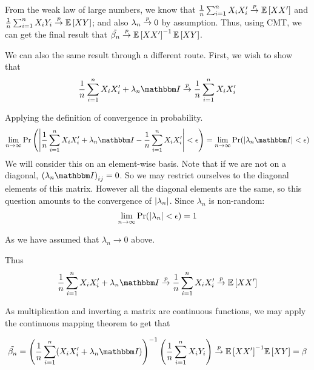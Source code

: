 \documentclass[12pt]{paper}
\begin{document}
From the weak law of large numbers, we know that $\frac{1}{n}
\sum_{i=1}^n X_i X_i' \overset{p}{\to} \mathbb{E} \left [ X X' \right ]$ and $\frac{1}{n} \sum_{i=1}^n X_i
Y_i \overset{p}{\to} \mathbb{E} \left [ XY \right ]$; and also $\lambda_n\overset{p}{\to}0$ by assumption. Thus, using CMT, we can get the final result that $ \tilde{\beta_n}\overset{p}{\to} \mathbb{E} \left [ X X' \right ]^{-1}\mathbb{E} \left [ XY \right ]$. 

We can also the same result through a different route. First, we wish to show that
\begin{equation*}
  \frac{1}{n} \sum_{i=1}^n X_i X_i' + \lambda_n \eye \plim \frac{1}{n} \sum_{i=1}^n X_i X_i'
\end{equation*}

Applying the definition of convergence in probability.
\begin{align*}
  \lim_{n\rightarrow\infty} \Pr\left( \abs{ \frac{1}{n} \sum_{i=1}^n X_i X_i' + \lambda_n \eye -
  \frac{1}{n} \sum_{i=1}^n X_i X_i' } < \epsilon\right) &= \lim_{n\rightarrow\infty} \Pr( \abs{ \lambda_n
                                          \eye } < \epsilon)\\
\end{align*}
We will consider this on an element-wise basis. Note that if we are
not on a diagonal, $\left( \lambda_n \eye \right)_{ij} = 0$. So we may
restrict ourselves to the diagonal elements of this matrix. However
all the diagonal elements are the same, so this question amounts to
the convergence of $\left \lvert \lambda_n \right \rvert$. Since $\lambda_n$ is non-random: 
\begin{align*}
  \lim_{n\rightarrow\infty} \Pr( \left \lvert  \lambda_n \right \rvert < \epsilon) = 1
\end{align*}

As we have assumed that $\lambda_n \rightarrow 0$ above.




Thus
\begin{equation*}
  \frac{1}{n} \sum_{i=1}^n X_i X_i' + \lambda_n \eye \plim \frac{1}{n}
  \sum_{i=1}^n X_i X_i' \plim \exV{X X'}
\end{equation*}

As multiplication and inverting a matrix are continuous functions, we
may apply the continuous mapping theorem to get that 

\begin{equation*}
  \tilde{\beta_n} = \inv{ \left( \frac{1}{n} \sum_{i=1}^n ( X_i X_i' + \lambda_n
      \eye) \right)} \left( \frac{1}{n} \sum_{i=1}^n X_i Y_i \right)
  \plim \inv{ \exV{X X'}} \exV{XY} = \beta
\end{equation*}
\end{document}
